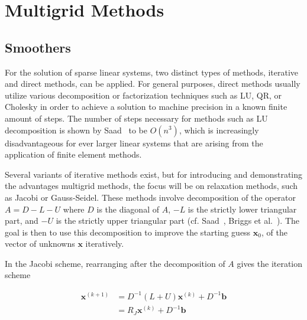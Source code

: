 
\chapter{Multigrid Methods}
\label{chapter:MultigridMethods}

\section{Smoothers}



For the solution of sparse linear systems, two distinct types of methods, iterative and direct methods, can be applied. For general purposes, direct methods usually utilize various decomposition or factorization techniques such as LU, QR, or Cholesky in order to achieve a solution to machine precision in a known finite amount of steps. The number of steps necessary for methods such as LU decomposition is shown by Saad~\cite{Saad2003} to be $O(n^3)$, which is increasingly disadvantageous for ever larger linear systems that are arising from the application of finite element methods.

Several variants of iterative methods exist, but for introducing and demonstrating the advantages multigrid methods, the focus will be on relaxation methods, such as Jacobi or Gauss-Seidel. These methods involve decomposition of the operator $A = D - L - U$ where $D$ is the diagonal of $A$, $-L$ is the strictly lower triangular part, and $-U$ is the strictly upper triangular part (cf. Saad~\cite{Saad2003}, Briggs et al.~\cite{Briggs2000}). The goal is then to use this decomposition to improve the starting guess $\mathbf{x}_{0}$, of the vector of unknowns $\mathbf{x}$ iteratively.

In the Jacobi scheme, rearranging after the decomposition of $A$ gives the iteration scheme

\begin{equation}
	\begin{aligned}
	\mathbf{x}^{(k+1)} &= D^{-1}(L + U)\mathbf{x}^{(k)} + D^{-1}\mathbf{b} \\
	                   &= R_J\mathbf{x}^{(k)} + D^{-1} \mathbf{b}
	\end{aligned}
\end{equation}

